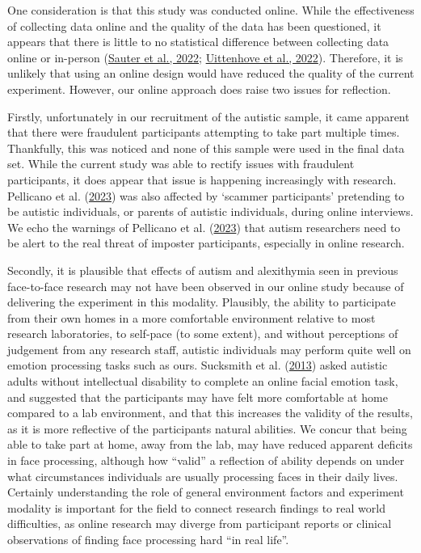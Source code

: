 \documentclass[
]{article}
\begin{document}
One consideration is that this study was conducted online. While the effectiveness of collecting data online and the quality of the data has been questioned, it appears that there is little to no statistical difference between collecting data online or in-person (\protect\hyperlink{ref-sauter2022a}{Sauter et al., 2022}; \protect\hyperlink{ref-uittenhove2022a}{Uittenhove et al., 2022}). Therefore, it is unlikely that using an online design would have reduced the quality of the current experiment. However, our online approach does raise two issues for reflection.

Firstly, unfortunately in our recruitment of the autistic sample, it came apparent that there were fraudulent participants attempting to take part multiple times. Thankfully, this was noticed and none of this sample were used in the final data set. While the current study was able to rectify issues with fraudulent participants, it does appear that issue is happening increasingly with research. Pellicano et al. (\protect\hyperlink{ref-pellicano2023a}{2023}) was also affected by `scammer participants' pretending to be autistic individuals, or parents of autistic individuals, during online interviews. We echo the warnings of Pellicano et al. (\protect\hyperlink{ref-pellicano2023a}{2023}) that autism researchers need to be alert to the real threat of imposter participants, especially in online research.

Secondly, it is plausible that effects of autism and alexithymia seen in previous face-to-face research may not have been observed in our online study because of delivering the experiment in this modality. Plausibly, the ability to participate from their own homes in a more comfortable environment relative to most research laboratories, to self-pace (to some extent), and without perceptions of judgement from any research staff, autistic individuals may perform quite well on emotion processing tasks such as ours. Sucksmith et al. (\protect\hyperlink{ref-sucksmith2013a}{2013}) asked autistic adults without intellectual disability to complete an online facial emotion task, and suggested that the participants may have felt more comfortable at home compared to a lab environment, and that this increases the validity of the results, as it is more reflective of the participants natural abilities. We concur that being able to take part at home, away from the lab, may have reduced apparent deficits in face processing, although how ``valid'' a reflection of ability depends on under what circumstances individuals are usually processing faces in their daily lives. Certainly understanding the role of general environment factors and experiment modality is important for the field to connect research findings to real world difficulties, as online research may diverge from participant reports or clinical observations of finding face processing hard ``in real life''.
\end{document}
